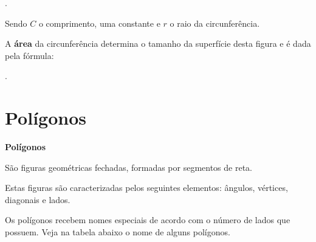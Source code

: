 .

Sendo $C$ o comprimento,  uma constante e $r$ o raio da circunferência.

A \textbf{área} da circunferência determina o tamanho da superfície desta figura e é dada pela fórmula:

.


\section{Polígonos}

\vskip0.3cm

\colorbox{azul}{
 \begin{minipage}{0.9\linewidth}
 \begin{center}
 \textbf{Polígonos}

  São figuras geométricas fechadas, formadas por segmentos de reta.

  Estas figuras são caracterizadas pelos seguintes elementos: ângulos, vértices, diagonais e lados.
 \end{center}
 \end{minipage}}

 \vskip0.3cm

  Os polígonos recebem nomes especiais de acordo com o número de lados que possuem. Veja na tabela abaixo o nome de alguns polígonos.


